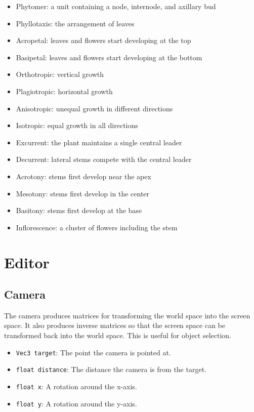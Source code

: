 \documentclass[10pt]{article}
\begin{document}
\begin{itemize}
\item Phytomer: a unit containing a node, internode, and axillary bud
\item Phyllotaxis: the arrangement of leaves
\item Acropetal: leaves and flowers start developing at the top
\item Basipetal: leaves and flowers start developing at the bottom
\item Orthotropic: vertical growth
\item Plagiotropic: horizontal growth
\item Anisotropic: unequal growth in different directions
\item Isotropic: equal growth in all directions
\item Excurrent: the plant maintains a single central leader
\item Decurrent: lateral stems compete with the central leader
\item Acrotony: stems first develop near the apex
\item Mesotony: stems first develop in the center
\item Basitony: stems first develop at the base
\item Inflorescence: a cluster of flowers including the stem
\end{itemize}

\section{Editor}

\subsection{Camera}

The camera produces matrices for transforming the world space into the screen space. It also produces inverse matrices so that the screen space can be transformed back into the world space. This is useful for object selection.
\begin{itemize}
\item \texttt{Vec3 target}: The point the camera is pointed at.
\item \texttt{float distance}: The distance the camera is from the target.
\item \texttt{float x}: A rotation around the x-axis.
\item \texttt{float y}: A rotation around the y-axis.
\end{itemize}
\end{document}
